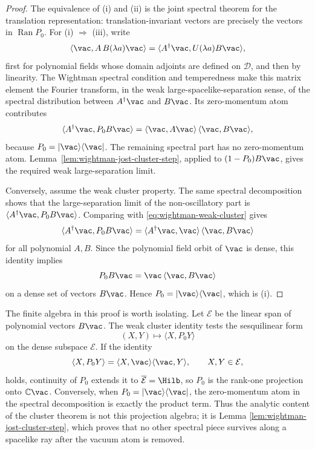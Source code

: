 \begin{proof}
The equivalence of (i) and (ii) is the joint spectral theorem for the
translation representation: translation-invariant vectors are precisely the
vectors in \(\operatorname{Ran}P_0\).  For (i) \(\Rightarrow\) (iii), write
\[
  \langle\vac,A\,B(\lambda a)\vac\rangle
  =
  \langle A^\dagger\vac,U(\lambda a)B\vac\rangle ,
\]
first for polynomial fields whose domain adjoints are defined on
\(\mathcal D\), and then by linearity.  The Wightman spectral condition and
temperedness make this matrix element the Fourier transform, in the weak
large-spacelike-separation sense, of the spectral distribution between
\(A^\dagger\vac\) and \(B\vac\).  Its zero-momentum atom contributes
\[
  \langle A^\dagger\vac,P_0 B\vac\rangle
  =
  \langle\vac,A\vac\rangle\,\langle\vac,B\vac\rangle ,
\]
because \(P_0=|\vac\rangle\langle\vac|\).  The remaining spectral part has no
zero-momentum atom.  Lemma~\ref{lem:wightman-jost-cluster-step}, applied to
\((1-P_0)B\vac\), gives the required weak large-separation limit.

Conversely, assume the weak cluster property.  The same spectral decomposition
shows that the large-separation limit of the non-oscillatory part is
\(\langle A^\dagger\vac,P_0B\vac\rangle\).  Comparing with
\eqref{eq:wightman-weak-cluster} gives
\[
  \langle A^\dagger\vac,P_0B\vac\rangle
  =
  \langle A^\dagger\vac,\vac\rangle\,\langle\vac,B\vac\rangle
\]
for all polynomial \(A,B\).  Since the polynomial field orbit of \(\vac\) is
dense, this identity implies
\[
  P_0B\vac=\vac\,\langle\vac,B\vac\rangle
\]
on a dense set of vectors \(B\vac\).  Hence \(P_0=|\vac\rangle\langle\vac|\),
which is (i).
\end{proof}

The finite algebra in this proof is worth isolating.  Let \(\mathcal E\) be
the linear span of polynomial vectors \(B\vac\).  The weak cluster identity
tests the sesquilinear form
\[
  (X,Y)\longmapsto \langle X,P_0Y\rangle
\]
on the dense subspace \(\mathcal E\).  If the identity
\[
  \langle X,P_0Y\rangle
  =
  \langle X,\vac\rangle\langle\vac,Y\rangle,
  \qquad X,Y\in\mathcal E,
\]
holds, continuity of \(P_0\) extends it to \(\overline{\mathcal E}=\Hilb\),
so \(P_0\) is the rank-one projection onto \(\mathbb C\vac\).  Conversely,
when \(P_0=|\vac\rangle\langle\vac|\), the zero-momentum atom in the spectral
decomposition is exactly the product term.  Thus the analytic content of the
cluster theorem is not this projection algebra; it is Lemma
\ref{lem:wightman-jost-cluster-step}, which proves that no other spectral
piece survives along a spacelike ray after the vacuum atom is removed.

